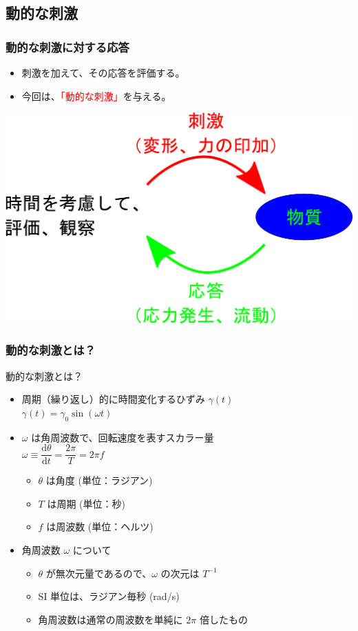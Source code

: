 \documentclass[unicode,12pt]{beamer}%
\begin{document}
\subsection{動的な刺激}
\begin{frame}
	\frametitle{動的な刺激に対する応答}
	\begin{itemize}
		\item 刺激を加えて、その応答を評価する。
		\item 今回は、\textcolor{red}{「動的な刺激」}を与える。
	\end{itemize}

	\vspace{5mm}
			\centering
				\includegraphics[width=.75\textwidth]{Rheo_method.png}
\end{frame}

\begin{frame}
	\frametitle{動的な刺激とは？}
	\begin{block}{動的な刺激とは？}
		\begin{itemize}
			\item 周期（繰り返し）的に時間変化するひずみ $\gamma (t)$\\
			$\gamma (t) = \gamma_0 \sin(\omega t)$
			\item $\omega$ は角周波数で、回転速度を表すスカラー量\\
			$\omega \equiv \dfrac{\mathrm{d} \theta}{\mathrm{d} t} = \dfrac{2 \pi}{T} = 2\pi f$
			\begin{itemize}
				\item $\theta$ は角度 (単位：ラジアン)
				\item $T$ は周期 (単位：秒)
				\item $f$ は周波数 (単位：ヘルツ)
				
			\end{itemize}
			\item 角周波数 $\omega$ について
			\begin{itemize}
				\item $\theta$ が無次元量であるので、$\omega$ の次元は $T^{-1}$
				\item SI 単位は、ラジアン毎秒 (rad/s)
				\item 角周波数は通常の周波数を単純に $2\pi$ 倍したもの
			\end{itemize}
		\end{itemize}
	\end{block}

\end{frame}
\end{document}

